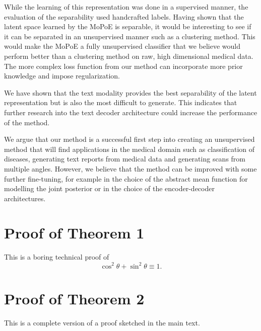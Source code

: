 \documentclass{midl} %
\begin{document}
    While the learning of this representation was done in a supervised manner, the evaluation of the separability used handcrafted labels.
    Having shown that the latent space learned by the MoPoE is separable, it would be interesting to see if it can be separated in an unsupervised manner such as a clustering method.
    This would make the MoPoE a fully unsupervised classifier that we believe would perform better than a clustering method on raw, high dimensional medical data.
    The more complex loss function from our method can incorporate more prior knowledge and impose regularization.
    
    
    We have shown that the text modality provides the best separability of the latent representation but is also the most difficult to generate.
    This indicates that further research into the text decoder architecture could increase the performance of the method.
    
    
    
    We argue that our method is a successful first step into creating an unsupervised method that will find applications in the medical domain such as classification of diseases, generating text reports from medical data and generating scans from multiple angles.
    However, we believe that the method can be improved with some further fine-tuning, for example in the choice of the abstract mean function for modelling the joint posterior or in the choice of the encoder-decoder architectures.







\appendix

\section{Proof of Theorem 1}

This is a boring technical proof of
\begin{equation}\label{eq:example}
\cos^2\theta + \sin^2\theta \equiv 1.
\end{equation}

\section{Proof of Theorem 2}

This is a complete version of a proof sketched in the main text.
\end{document}
